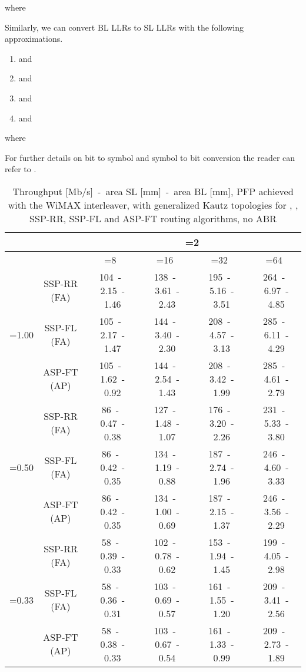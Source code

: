 \documentclass[10pt,twocolumn,journal]{IEEEtran}
\begin{document}
where 

Similarly, we can convert BL LLRs to SL LLRs with the following approximations.
\begin{enumerate}
\item  and 

\item  and 

\item  and 

\item  and 

\end{enumerate}
where 

For further details on bit to symbol and symbol to bit conversion the reader can refer to \cite{kim_TCASII09}.
\begin{table*}[t!]
  \centering
  \caption{Throughput [Mb/s]~-~area SL [mm]~-~area BL [mm], PFP achieved with the WiMAX  interleaver, 
with generalized Kautz topologies for , , SSP-RR, SSP-FL and ASP-FT routing algorithms, no ABR} 
  \label{tab:wimax}
   { \scriptsize
  \begin{tabular}{|c|c|c|c|c|c|}
\hline
& 	 & \multicolumn{4}{c|}{=2} \\
\hline
& 	 & =8 & =16 & =32 & =64 \\
\hline
\multirow{3}{*}{=1.00} & SSP-RR (FA) & 104~-~2.15~-~1.46 & 138~-~3.61~-~2.43 & 195~-~5.16~-~3.51 & 264~-~6.97~-~4.85 \\
& SSP-FL (FA) & 105~-~2.17~-~1.47 & 144~-~3.40~-~2.30 & 208~-~4.57~-~3.13 & 285~-~6.11~-~4.29 \\
& ASP-FT (AP) & 105~-~1.62~-~0.92 & 144~-~2.54~-~1.43 & 208~-~3.42~-~1.99 & 285~-~4.61~-~2.79 \\
\hline
\multirow{3}{*}{=0.50} & SSP-RR (FA) & 86~-~0.47~-~0.38 & 127~-~1.48~-~1.07 & 176~-~3.20~-~2.26 & 231~-~5.33~-~3.80 \\
& SSP-FL (FA) & 86~-~0.42~-~0.35 & 134~-~1.19~-~0.88 & 187~-~2.74~-~1.96 & 246~-~4.60~-~3.33 \\
& ASP-FT (AP) & 86~-~0.42~-~0.35 & 134~-~1.00~-~0.69 & 187~-~2.15~-~1.37 & 246~-~3.56~-~2.29 \\
\hline
\multirow{3}{*}{=0.33} & SSP-RR (FA) & 58~-~0.39~-~0.33 & 102~-~0.78~-~0.62 & 153~-~1.94~-~1.45 & 199~-~4.05~-~2.98 \\
& SSP-FL (FA) & 58~-~0.36~-~0.31 & 103~-~0.69~-~0.57 & 161~-~1.55~-~1.20 & 209~-~3.41~-~2.56 \\
& ASP-FT (AP) & 58~-~0.38~-~0.33 & 103~-~0.67~-~0.54 & 161~-~1.33~-~0.99 & 209~-~2.73~-~1.89 \\

\end{tabular}}
\end{table*}
\end{document}
